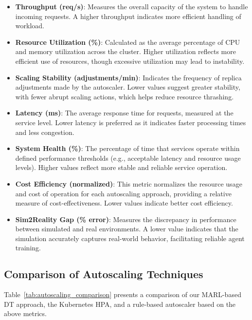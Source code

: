 \documentclass[conference]{IEEEtran}
\begin{document}
\begin{itemize}
    \item \textbf{Throughput (req/s)}: Measures the overall capacity of the system to handle incoming requests. A higher throughput indicates more efficient handling of workload.
    \item \textbf{Resource Utilization (\%)}: Calculated as the average percentage of CPU and memory utilization across the cluster. Higher utilization reflects more efficient use of resources, though excessive utilization may lead to instability.
    \item \textbf{Scaling Stability (adjustments/min)}: Indicates the frequency of replica adjustments made by the autoscaler. Lower values suggest greater stability, with fewer abrupt scaling actions, which helps reduce resource thrashing.
    \item \textbf{Latency (ms)}: The average response time for requests, measured at the service level. Lower latency is preferred as it indicates faster processing times and less congestion.
    \item \textbf{System Health (\%)}: The percentage of time that services operate within defined performance thresholds (e.g., acceptable latency and resource usage levels). Higher values reflect more stable and reliable service operation.
    \item \textbf{Cost Efficiency (normalized)}: This metric normalizes the resource usage and cost of operation for each autoscaling approach, providing a relative measure of cost-effectiveness. Lower values indicate better cost efficiency.
    \item \textbf{Sim2Reality Gap (\% error)}: Measures the discrepancy in performance between simulated and real environments. A lower value indicates that the simulation accurately captures real-world behavior, facilitating reliable agent training.
\end{itemize}

\subsection{Comparison of Autoscaling Techniques}

Table~\ref{tab:autoscaling_comparison} presents a comparison of our MARL-based DT approach, the Kubernetes HPA, and a rule-based autoscaler based on the above metrics.
\end{document}
